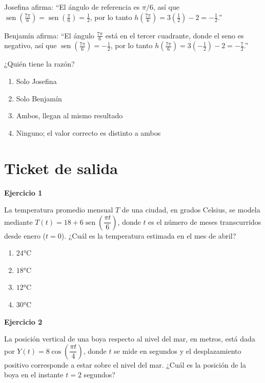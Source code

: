 \documentclass[12pt,letterpaper]{article}
\providecommand{\sen}{\operatorname{sen}}
\begin{document}
Josefina afirma: ``El ángulo de referencia es $\pi/6$, así que $\sen\left(\frac{7\pi}{6}\right)=\sen\left(\frac{\pi}{6}\right)=\frac12$, por lo tanto $h\left(\frac{7\pi}{6}\right)=3\left(\frac12\right)-2=-\frac12$.''

Benjamín afirma: ``El ángulo $\frac{7\pi}{6}$ está en el tercer cuadrante, donde el seno es negativo, así que $\sen\left(\frac{7\pi}{6}\right)=-\frac12$, por lo tanto $h\left(\frac{7\pi}{6}\right)=3\left(-\frac12\right)-2=-\frac72$.''

¿Quién tiene la razón?

\begin{enumerate}[label=\Alph*)]
    \item Solo Josefina
    \item Solo Benjamín
    \item Ambos, llegan al mismo resultado
    \item Ninguno; el valor correcto es distinto a ambos
\end{enumerate}

\vspace{3.5cm}
\newpage

\section{Ticket de salida}

\textbf{Ejercicio 1}

La temperatura promedio mensual $T$ de una ciudad, en grados Celsius, se modela mediante $T(t)=18+6\sen\left(\dfrac{\pi t}{6}\right)$, donde $t$ es el número de meses transcurridos desde enero ($t=0$). ¿Cuál es la temperatura estimada en el mes de abril?

\begin{enumerate}[label=\Alph*)]
    \item $24°\text{C}$
    \item $18°\text{C}$
    \item $12°\text{C}$
    \item $30°\text{C}$
\end{enumerate}

\vspace{3.5cm}

\textbf{Ejercicio 2}

La posición vertical de una boya respecto al nivel del mar, en metros, está dada por $Y(t)=8\cos\left(\dfrac{\pi t}{4}\right)$, donde $t$ se mide en segundos y el desplazamiento positivo corresponde a estar sobre el nivel del mar. ¿Cuál es la posición de la boya en el instante $t=2$ segundos?
\end{document}
